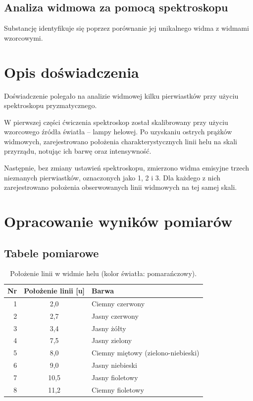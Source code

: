 \documentclass[a4paper,12pt]{article}
\begin{document}
\subsection*{Analiza widmowa za pomocą spektroskopu}

Substancję identyfikuje się poprzez porównanie jej unikalnego widma z widmami wzorcowymi.

\section{Opis doświadczenia}

Doświadczenie polegało na analizie widmowej kilku pierwiastków przy użyciu spektroskopu pryzmatycznego.

W pierwszej części ćwiczenia spektroskop został skalibrowany przy użyciu wzorcowego źródła światła -- lampy helowej. Po uzyskaniu ostrych prążków widmowych, zarejestrowano położenia charakterystycznych linii helu na skali przyrządu, notując ich barwę oraz intensywność.

Następnie, bez zmiany ustawień spektroskopu, zmierzono widma emisyjne trzech nieznanych pierwiastków, oznaczonych jako 1, 2 i 3. Dla każdego z nich zarejestrowano położenia obserwowanych linii widmowych na tej samej skali.

\section{Opracowanie wyników pomiarów}

\subsection{Tabele pomiarowe}

\begin{table}[H]
    \centering
    \begin{tabular}{|r|c|l|}
        \hline
        Nr & Położenie linii [u] & Barwa \\ \hline
        1 & 2{,}0 & Ciemny czerwony \\ \hline
        2 & 2{,}7 & Jasny czerwony \\ \hline
        3 & 3{,}4 & Jasny żółty \\ \hline
        4 & 7{,}5 & Jasny zielony \\ \hline
        5 & 8{,}0 & Ciemny miętowy (zielono-niebieski) \\ \hline
        6 & 9{,}0 & Jasny niebieski \\ \hline
        7 & 10{,}5 & Jasny fioletowy \\ \hline
        8 & 11{,}2 & Ciemny fioletowy \\ \hline
    \end{tabular}
    \caption{Położenie linii w widmie helu (kolor światła: pomarańczowy).}
    \label{tab:hel}
\end{table}
\end{document}
